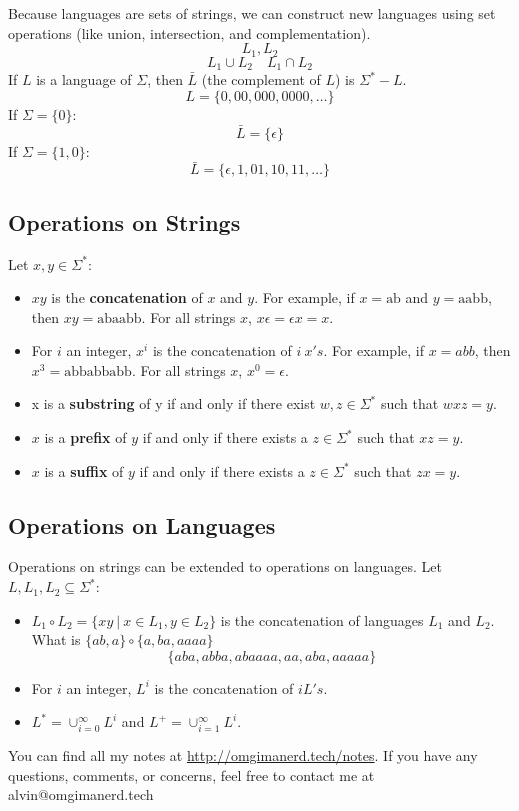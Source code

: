 \documentclass[letterpaper, 12pt]{math}
\begin{document}
Because languages are sets of strings, we can construct new languages using
set operations (like union, intersection, and complementation).
\[ L_{1}, L_{2} \]
\[ L_{1}\cup L_{2} \quad L_{1}\cap L_{2} \]
If \( L \) is a language of \( \Sigma \), then \( \bar{L} \) (the complement of
\( L \)) is \( \Sigma^*-L \).
\[ L = \{0,00,000,0000,\dots\} \]
If \( \Sigma = \{0\} \):
\[ \bar{L} = \{\epsilon\} \]
If \( \Sigma = \{1,0\} \):
\[ \bar{L} = \{\epsilon,1,01,10,11,\dots\} \]

\subsection*{Operations on Strings}
Let \( x,y\in\Sigma^* \):
\begin{itemize}
  \item \( xy \) is the \textbf{concatenation} of \( x \) and \( y \). For
    example, if \( x = \text{ab} \) and \( y = \text{aabb} \), then \( xy =
    \text{abaabb} \). For all strings \( x \), \( x\epsilon = \epsilon x =
    x \).
  \item For \( i \) an integer, \( x^i \) is the concatenation of \( i\ x's \).
    For example, if \( x = abb \), then \( x^{3} = \text{abbabbabb} \). For all
    strings \( x \), \( x^0 = \epsilon \).
  \item x is a \textbf{substring} of y if and only if there exist \( w,z\in
    \Sigma^* \) such that \( wxz = y \).
  \item \( x \) is a \textbf{prefix} of \( y \) if and only if there exists a
    \( z\in\Sigma^* \) such that \( xz = y \).
  \item \( x \) is a \textbf{suffix} of \( y \) if and only if there exists a
    \( z\in\Sigma^* \) such that \( zx = y \).
\end{itemize}

\subsection*{Operations on Languages}
Operations on strings can be extended to operations on languages. Let
\( L,L_1,L_2\subseteq\Sigma^* \):
\begin{itemize}
  \item \( L_1\circ L_2 = \{xy\ |\ x\in L_1,y\in L_2\} \) is the concatenation
    of languages \( L_1 \) and \( L_2 \). What is \( \{ab,a\}\circ\{a,ba,aaaa\}
    \)
    \[ \{aba,abba,abaaaa,aa,aba,aaaaa\} \]
  \item For \( i \) an integer, \( L^i \) is the concatenation of \( i L's \).
  \item \( L^* = \cup_{i=0}^{\infty}L^i \) and
    \( L^+ = \cup_{i=1}^{\infty}L^i \).
\end{itemize}

\begin{center}
  You can find all my notes at \url{http://omgimanerd.tech/notes}. If you have
  any questions, comments, or concerns, feel free to contact me at
  alvin@omgimanerd.tech
\end{center}
\end{document}
